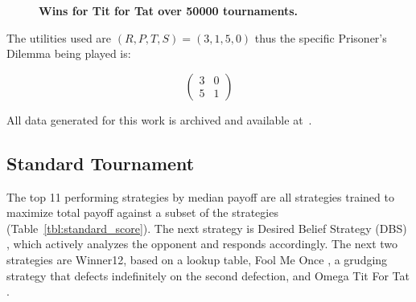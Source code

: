 \documentclass[10pt,letterpaper]{article}
\begin{document}
\begin{figure}[!hbtp]
        \centering
        \caption{\bf Wins for Tit for Tat over
        50000 tournaments.}
        \label{fig:tit_for_tat_wins}
\end{figure}


The utilities used are \((R, P, T, S)=(3, 1, 5, 0)\) thus the specific
Prisoner's Dilemma being played is:

\begin{equation}\label{equ:pd}
    \begin{pmatrix}
        3 & 0\\
        5 & 1
    \end{pmatrix}
\end{equation}

All data generated for this work is archived and available at~\cite{data}.

\subsection*{Standard Tournament}\label{sec:standard}

The top 11 performing strategies by median payoff are all strategies trained to maximize
total payoff against a subset of the strategies (Table~\ref{tbl:standard_score}).
The next strategy is Desired Belief Strategy (DBS) \cite{Au2006},
which actively analyzes the opponent and responds
accordingly. The next two strategies are Winner12, based on a lookup table,
Fool Me Once \cite{axelrodproject}, a grudging strategy that defects indefinitely on
the second defection, and Omega Tit For Tat \cite{kendall2007iterated}.
\end{document}
